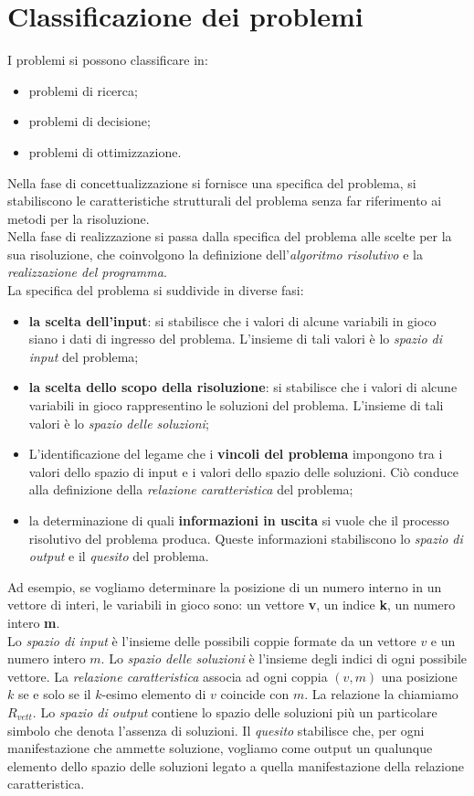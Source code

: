 \documentclass[12pt]{report}
\begin{document}
   	\section{Classificazione dei problemi}
   	I problemi si possono classificare in:
   	\begin{itemize}
   		\item problemi di ricerca;
   		\item problemi di decisione;
   		\item problemi di ottimizzazione.
   	\end{itemize}
   	Nella fase di concettualizzazione si fornisce una specifica del problema, si stabiliscono le caratteristiche strutturali del problema senza far riferimento ai metodi per la risoluzione. \\
   	Nella fase di realizzazione si passa dalla specifica del problema alle scelte per la sua risoluzione, che coinvolgono la definizione dell'\textit{algoritmo risolutivo} e la \textit{realizzazione del programma}. \\
   	La specifica del problema si suddivide in diverse fasi:
   	\begin{itemize}
   		\item \textbf{la scelta dell'input}: si stabilisce che i valori di alcune variabili in gioco siano i dati di ingresso del problema. L'insieme di tali valori è lo \textit{spazio di input} del problema;
   		\item \textbf{la scelta dello scopo della risoluzione}: si stabilisce che i valori di alcune variabili in gioco rappresentino le soluzioni del problema. L'insieme di tali valori è lo \textit{spazio delle soluzioni};
   		\item L'identificazione del legame che i \textbf{vincoli del problema} impongono tra i valori dello spazio di input e i valori dello spazio delle soluzioni. Ciò conduce alla definizione della \textit{relazione caratteristica} del problema;
   		\item la determinazione di quali \textbf{informazioni in uscita} si vuole che il processo risolutivo del problema produca. Queste informazioni stabiliscono lo \textit{spazio di output} e il \textit{quesito} del problema.
   	\end{itemize}
   	Ad esempio, se vogliamo determinare la posizione di un numero interno in un vettore di interi, le variabili in gioco sono: un vettore \textbf{v}, un indice \textbf{k}, un numero intero \textbf{m}. \\
   	Lo \textit{spazio di input} è l'insieme delle possibili coppie formate da un vettore $v$ e un numero intero $m$. Lo \textit{spazio delle soluzioni} è l'insieme degli indici di ogni possibile vettore. La \textit{relazione caratteristica} associa ad ogni coppia $(v, m)$ una posizione $k$ se e solo se il $k$-esimo elemento di $v$ coincide con $m$. La relazione la chiamiamo $R_{vett}$. Lo \textit{spazio di output} contiene lo spazio delle soluzioni più un particolare simbolo che denota l'assenza di soluzioni. Il \textit{quesito} stabilisce che, per ogni manifestazione che ammette soluzione, vogliamo come output un qualunque elemento dello spazio delle soluzioni legato a quella manifestazione della relazione caratteristica.
\end{document}
